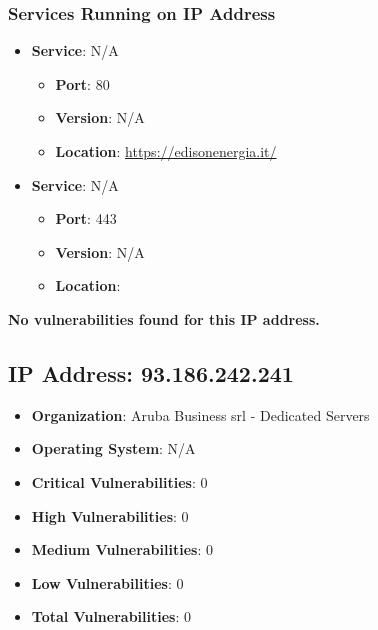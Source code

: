 \documentclass{article}
\begin{document}
\subsubsection*{Services Running on IP Address}

\begin{itemize}
    
        \item \textbf{Service}: N/A
        \begin{itemize}
            \item \textbf{Port}: 80
            \item \textbf{Version}:  N/A 
            \item \textbf{Location}: \href{ https://edisonenergia.it/ }{ https://edisonenergia.it/ }
        \end{itemize}
    
        \item \textbf{Service}: N/A
        \begin{itemize}
            \item \textbf{Port}: 443
            \item \textbf{Version}:  N/A 
            \item \textbf{Location}: \href{  }{  }
        \end{itemize}
    
\end{itemize}


\textbf{No vulnerabilities found for this IP address.}




\clearpage



\subsection{IP Address: 93.186.242.241}

\begin{itemize}
    \item \textbf{Organization}: Aruba Business srl - Dedicated Servers
    \item \textbf{Operating System}:  N/A 
    \item \textbf{Critical Vulnerabilities}: 0
    \item \textbf{High Vulnerabilities}: 0
    \item \textbf{Medium Vulnerabilities}: 0
    \item \textbf{Low Vulnerabilities}: 0
    \item \textbf{Total Vulnerabilities}: 0
\end{itemize}
\end{document}
